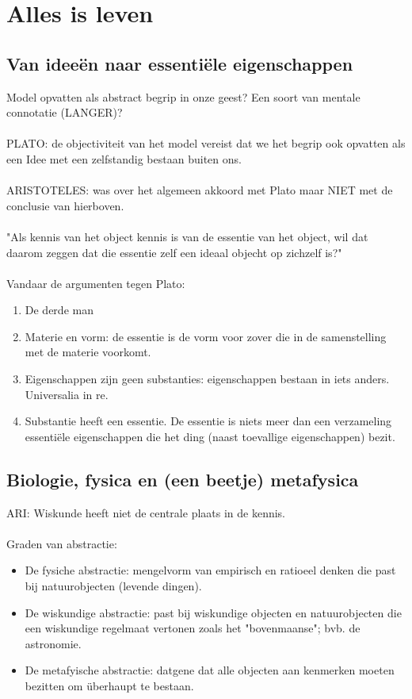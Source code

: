 \documentclass[11pt,a4paper]{article}
\begin{document}
\section{Alles is leven}
\subsection{Van idee\"en naar essenti\"ele eigenschappen}
Model opvatten als abstract begrip in onze geest? Een soort van mentale connotatie (LANGER)?
\\
\\
PLATO: de objectiviteit van het model vereist dat we het begrip ook opvatten als een Idee met een zelfstandig bestaan buiten ons.
\\
\\
ARISTOTELES: was over het algemeen akkoord met Plato maar NIET met de conclusie van hierboven.
\\
\\
"Als kennis van het object kennis is van de essentie van het object, wil dat daarom zeggen dat die essentie zelf een ideaal objecht op zichzelf is?"
\\
\\
Vandaar de argumenten tegen Plato:
\begin{enumerate}
\item De derde man
\item Materie en vorm: de essentie is de vorm voor zover die in de samenstelling met de materie voorkomt.
\item Eigenschappen zijn geen substanties: eigenschappen bestaan in iets anders. Universalia in re.
\item Substantie heeft een essentie. De essentie is niets meer dan een verzameling essenti\"ele eigenschappen die het ding (naast toevallige eigenschappen) bezit.
\end{enumerate}


\subsection{Biologie, fysica en (een beetje) metafysica}
ARI: Wiskunde heeft niet de centrale plaats in de kennis. 
\\
\\
Graden van abstractie:
\begin{itemize}
\item De fysiche abstractie: mengelvorm van empirisch en ratioeel denken die past bij natuurobjecten (levende dingen).
\item De wiskundige abstractie: past bij wiskundige objecten en natuurobjecten die een wiskundige regelmaat vertonen zoals het "bovenmaanse"; bvb. de astronomie.
\item De metafyische abstractie: datgene dat alle objecten aan kenmerken moeten bezitten om \"uberhaupt te bestaan.

\end{itemize}
\end{document}
